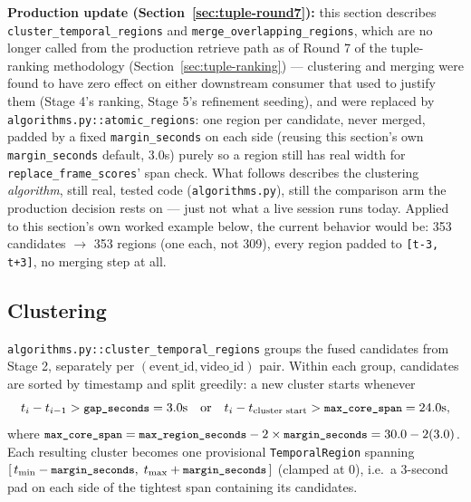 \documentclass[11pt]{article}
\newcommand{\code}[1]{\texttt{\small #1}}
\newcommand{\file}[1]{\texttt{\footnotesize #1}}
\newcommand{\corr}[1]{\textbf{\textcolor{red!60!black}{#1}}}
\begin{document}
\corr{Production update (Section~\ref{sec:tuple-round7}):} this section
describes \code{cluster\_temporal\_regions} and
\code{merge\_overlapping\_regions}, which are no longer called from the
production retrieve path as of Round 7 of the tuple-ranking methodology
(Section~\ref{sec:tuple-ranking}) --- clustering and merging were found to
have zero effect on either downstream consumer that used to justify them
(Stage 4's ranking, Stage 5's refinement seeding), and were replaced by
\code{algorithms.py::atomic\_regions}: one region per candidate, never
merged, padded by a fixed \code{margin\_seconds} on each side (reusing this
section's own \code{margin\_seconds} default, 3.0s) purely so a region still
has real width for \code{replace\_frame\_scores}' span check. What follows
describes the clustering \emph{algorithm}, still real, tested code
(\file{algorithms.py}), still the comparison arm the production decision
rests on --- just not what a live session runs today. Applied to this
section's own worked example below, the current behavior would be: 353
candidates $\to$ 353 regions (one each, not 309), every region padded to
\code{[t-3, t+3]}, no merging step at all.

\subsection{Clustering}
\file{algorithms.py::cluster\_temporal\_regions} groups the fused candidates
from Stage 2, separately per $(\text{event\_id}, \text{video\_id})$ pair.
Within each group, candidates are sorted by timestamp and split greedily: a
new cluster starts whenever
\[
  t_i - t_{i-1} > \code{gap\_seconds} = 3.0\text{s}
  \quad\text{or}\quad
  t_i - t_{\text{cluster start}} > \code{max\_core\_span} = 24.0\text{s},
\]
where $\code{max\_core\_span} = \code{max\_region\_seconds} - 2 \times
\code{margin\_seconds} = 30.0 - 2(3.0)$. Each resulting cluster becomes one
provisional \code{TemporalRegion} spanning
$[\,t_{\min}-\code{margin\_seconds},\; t_{\max}+\code{margin\_seconds}\,]$
(clamped at 0), i.e.\ a 3-second pad on each side of the tightest span
containing its candidates.
\end{document}
